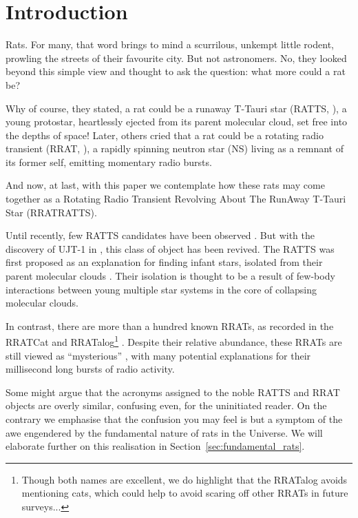 \documentclass[twocolumn, twocolappendix]{aastex631}
\newcommand{\tauriRAT}{RATTS\xspace}
\newcommand{\radioRAT}{RRAT\xspace}
\newcommand{\binaryRAT}{RRATRATTS\xspace}
\begin{document}


\section{Introduction}
Rats. For many, that word brings to mind a scurrilous, unkempt little rodent, prowling the streets of their favourite city. But not astronomers. No, they looked beyond this simple view and thought to ask the question: what more could a rat be?

Why of course, they stated, a rat could be a runaway T-Tauri star (\tauriRAT, \citealp{Sterzik+1995}), a young protostar, heartlessly ejected from its parent molecular cloud, set free into the depths of space! Later, others cried that a rat could be a rotating radio transient (\radioRAT, \citealp{McLaughlin+2006}), a rapidly spinning neutron star (NS) living as a remnant of its former self, emitting momentary radio bursts.

And now, at last, with this paper we contemplate how these rats may come together as a Rotating Radio Transient Revolving About The RunAway T-Tauri Star (\binaryRAT).

Until recently, few \tauriRAT candidates have been observed \citep[e.g.][]{Neuhauser+1996,Neuhaeuser+1997}. But with the discovery of UJT-1 in \citet{Marti+2023}, this class of object has been revived. The \tauriRAT was first proposed as an explanation for finding infant stars, isolated from their parent molecular clouds \citep{Sterzik+1995, Sterzik+1995b}. Their isolation is thought to be a result of few-body interactions between young multiple star systems in the core of collapsing molecular clouds.

In contrast, there are more than a hundred known \radioRAT{}s, as recorded in the RRATCat \citep{RRATCat} and RRATalog\footnote{Though both names are excellent, we do highlight that the RRATalog avoids mentioning cats, which could help to avoid scaring off other \radioRAT{}s in future surveys...} \citep{RRATalog}. Despite their relative abundance, these \radioRAT{}s are still viewed as ``mysterious'' \citep[e.g.][]{mysterious_RRAT}, with many potential explanations for their millisecond long bursts of radio activity.

Some might argue that the acronyms assigned to the noble \tauriRAT and \radioRAT objects are overly similar, confusing even, for the uninitiated reader. On the contrary we emphasise that the confusion you may feel is but a symptom of the awe engendered by the fundamental nature of rats in the Universe. We will elaborate further on this realisation in Section~\ref{sec:fundamental_rats}.
\end{document}
